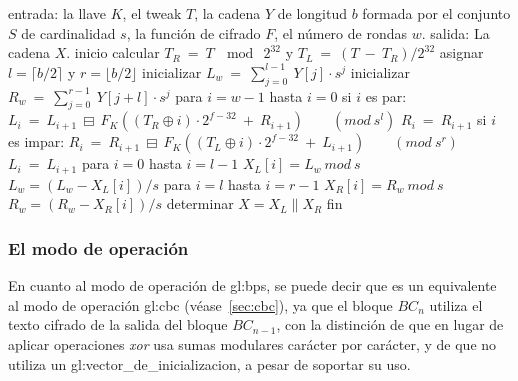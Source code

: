 \begin{pseudocodigo}[caption={Proceso de descifrado $BC^{-1}$.},
label={descifrado_BC}]
    entrada:    la llave $K$,
                el tweak $T$,
                la cadena $Y$ de longitud $b$ formada por el conjunto $S$
                  de cardinalidad $s$,
                la función de cifrado $F$,
                el número de rondas $w$.
    salida:     La cadena $X$.
    inicio
      calcular $T_R\: =\: T\: \mod\: 2^{32}$ y $T_L\: =\: (T\: -\: T_R) / 2^{32}$
      asignar $l = \lceil b/2 \rceil$ y $r = \lfloor b/2 \rfloor$
      inicializar $L_w\: =\: \sum_{j=0}^{l-1}\: Y[j] \cdot s^j$
      inicializar $R_w\: =\: \sum_{j=0}^{r-1}\: Y[j+l] \cdot s^j$
      para $i=w-1$ hasta $i=0$
      si $i$ es par:
        $L_i\: =\: L_{i+1}\: \boxminus\: F_K((T_R \oplus i) \cdot 2^{f-32}\: +\: R_{i+1})\qquad (mod\ s^l)$
        $R_i\: =\: R_{i+1}$
      si $i$ es impar:
        $R_i\: =\: R_{i+1}\: \boxminus\: F_K((T_L \oplus i) \cdot 2^{f-32}\: +\: L_{i+1})\qquad (mod\ s^r)$
        $L_i\: =\: L_{i+1}$
      para $i=0$ hasta $i=l-1$
        $X_L[i] = L_w\ mod\ s$
        $L_w = (L_w - X_L[i])/s$
      para $i=l$ hasta $i=r-1$
        $X_R[i] = R_w\ mod\ s$
        $R_w = (R_w - X_R[i])/s$
      determinar $X = X_L \parallel X_R$
    fin
\end{pseudocodigo}


\subsubsection{El modo de operación}
\label{sec:bps_modo_operacion}

En cuanto al modo de operación de \gls{gl:bps}, se puede decir que es un
equivalente al modo de operación \gls{gl:cbc} (véase~\ref{sec:cbc}), ya que el
bloque $BC_n$ utiliza el texto cifrado de la salida del bloque $BC_{n-1}$, con la
distinción de que en lugar de aplicar operaciones \textit{xor} usa sumas
modulares carácter por carácter, y de que no utiliza un
\gls{gl:vector_de_inicializacion}, a pesar de soportar su uso.


